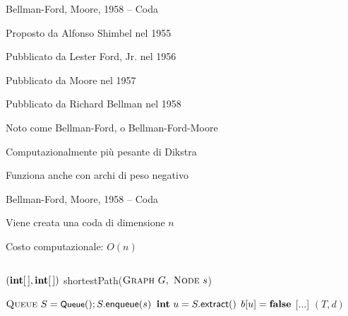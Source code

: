 \begin{frame}{Bellman-Ford, Moore, 1958 -- Coda}

\BI
\item Proposto da Alfonso Shimbel nel 1955
\item Pubblicato da Lester Ford, Jr. nel 1956
\item Pubblicato da Moore nel 1957
\item Pubblicato da Richard Bellman nel 1958
\item Noto come Bellman-Ford, o Bellman-Ford-Moore
\EI

\bigskip
{}
\BI
\item Computazionalmente più pesante di Dikstra
\item Funziona anche con archi di peso negativo
\EI

\end{frame}


\begin{frame}{Bellman-Ford, Moore, 1958 -- Coda}

\smallskip
{}
\BI
\item Viene creata una coda di dimensione $n$
\item Costo computazionale: $O(n)$
\EI

\vspace{-18pt}
\begin{columns}
\small
\begin{Procedure}
\caption[A]{$(\INTARRAY, \INTARRAY)$ \textsf{shortestPath}($\textsc{Graph}\ G,\ \textsc{Node}\ s$)}
\alert{$\textsc{Queue}\ S = \textsf{{\small Queue}}(); S.\textsf{enqueue}(s)$}\;
{
  $\INTEGER\ u = S.\textsf{extract}()$\;
  $b[u] = \FALSE$\;
  {
    {
      [...]
    }
  }
}
\Return $(T,d)$
\end{Procedure}
\end{columns}




\end{frame}


